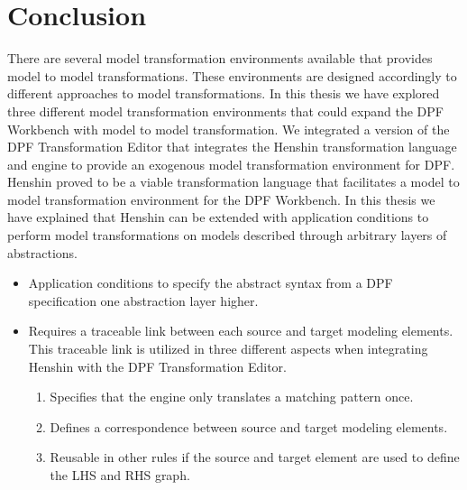 
\chapter{Conclusion} %

\label{Chapter7} %


There are several model transformation environments available that provides
model to model transformations. These environments are designed accordingly
to different approaches to model transformations. In this thesis we have
explored three different model transformation environments that could expand the
DPF Workbench with model to model transformation. We integrated a version of the
DPF Transformation Editor that integrates the Henshin transformation language
and engine to provide an exogenous model transformation environment for DPF.
Henshin proved to be a viable transformation language that facilitates a model
to model transformation environment for the DPF Workbench. In this thesis we
have explained that Henshin can be extended with application conditions to
perform model transformations on models described through arbitrary layers of
abstractions. 

\begin{itemize}
  \item Application conditions to specify the abstract syntax from a DPF
  specification one abstraction layer higher.
   \item Requires a traceable link between each source and target modeling
  elements. This traceable link is utilized in three different aspects when
  integrating Henshin with the DPF Transformation Editor. 
	\begin{enumerate} 
	  	\item Specifies that the engine only translates a matching pattern once.
        \item Defines a correspondence between source and target modeling
        elements. 
        \item Reusable in other rules if the source and target element are used
        to define the LHS and RHS graph.
     \end{enumerate}
     
\end{itemize}


